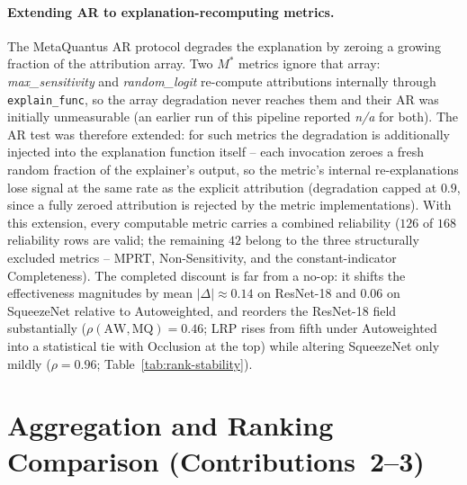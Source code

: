 \paragraph{Extending AR to explanation-recomputing metrics.}
The MetaQuantus AR protocol degrades the explanation by zeroing a growing
fraction of the attribution array. Two $M^{*}$ metrics ignore that array:
\emph{max\_sensitivity} and \emph{random\_logit} re-compute attributions
internally through \texttt{explain\_func}, so the array degradation never
reaches them and their AR was initially unmeasurable (an earlier run of this
pipeline reported \textit{n/a} for both). The AR test was therefore
extended: for such metrics the degradation is additionally injected into the
explanation function itself -- each invocation zeroes a fresh random fraction
of the explainer's output, so the metric's internal re-explanations lose
signal at the same rate as the explicit attribution (degradation capped at
$0.9$, since a fully zeroed attribution is rejected by the metric
implementations). With this extension, every computable metric carries a
combined reliability ($126$ of $168$ reliability rows are valid; the
remaining $42$ belong to the three structurally excluded metrics -- MPRT,
Non-Sensitivity, and the constant-indicator Completeness). The completed
discount
is far from a no-op: it shifts the effectiveness magnitudes by mean
$|\Delta|\approx0.14$ on ResNet-18 and $0.06$ on SqueezeNet relative to
Autoweighted, and reorders the ResNet-18
field substantially ($\rho(\mathrm{AW},\mathrm{MQ}) = 0.46$; LRP rises from
fifth under Autoweighted into a statistical tie with Occlusion at the
top) while altering
SqueezeNet only mildly
($\rho = 0.96$;
Table~\ref{tab:rank-stability}).

\section{Aggregation and Ranking Comparison (Contributions~2--3)}
\label{sec:exp-ranking}

